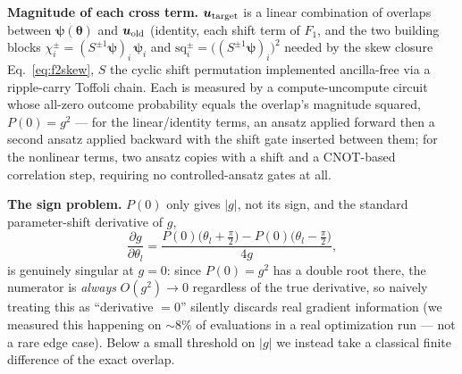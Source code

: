 \documentclass[aps,pra,twocolumn,notitlepage,superscriptaddress,floatfix,10pt]{revtex4-2}
\begin{document}
\textbf{Magnitude of each cross term.} $\bm u_{\rm target}$ is a linear combination of overlaps
between $\bm\psi(\bm\theta)$ and $\bm u_{\rm old}$ (identity, each shift term of $F_1$, and the two
building blocks $\chi^{\pm}_i=(S^{\pm1}\bm\psi)_i\,\bm\psi_i$ and
$\mathrm{sq}^{\pm}_i=\big((S^{\pm1}\bm\psi)_i\big)^2$ needed by the skew closure
Eq.~\eqref{eq:f2skew}, $S$ the cyclic shift permutation implemented ancilla-free via a
ripple-carry Toffoli chain. Each is measured by a compute-uncompute circuit whose all-zero
outcome probability equals the overlap's magnitude squared, $P(0)=g^2$ --- for the linear/identity
terms, an ansatz applied forward then a second ansatz applied backward with the shift gate inserted
between them; for the nonlinear terms, two ansatz copies with a shift and a CNOT-based correlation
step, requiring no controlled-ansatz gates at all.

\textbf{The sign problem.} $P(0)$ only gives $|g|$, not its sign, and the standard parameter-shift
derivative of $g$,
\begin{equation}
\frac{\partial g}{\partial\theta_l}=\frac{P(0)\big(\theta_l+\tfrac\pi2\big)-P(0)\big(\theta_l-\tfrac\pi2\big)}{4g},
\label{eq:paramshift}
\end{equation}
is genuinely singular at $g=0$: since $P(0)=g^2$ has a double root there, the numerator is \emph{always}
$O(g^2)\to0$ regardless of the true derivative, so naively treating this as ``derivative $=0$''
silently discards real gradient information (we measured this happening on $\sim8\%$ of evaluations
in a real optimization run --- not a rare edge case). Below a small threshold on $|g|$ we instead take
a classical finite difference of the exact overlap.
\end{document}
